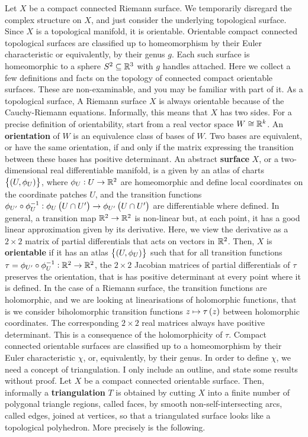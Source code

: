 Let $ X $ be a compact connected Riemann surface. We temporarily disregard the complex structure on $ X $, and just consider the underlying topological surface. Since $ X $ is a topological manifold, it is orientable. Orientable compact connected topological surfaces are classified up to homeomorphism by their Euler characteristic or equivalently, by their genus $ g $. Each such surface is homeomorphic to a sphere $ S^2 \subseteq \mathbb{R}^3 $ with $ g $ handles attached. Here we collect a few definitions and facts on the topology of connected compact orientable surfaces. These are non-examinable, and you may be familiar with part of it. As a topological surface, A Riemann surface $ X $ is always orientable because of the Cauchy-Riemann equations. Informally, this means that $ X $ has two sides. For a precise definition of orientability, start from a real vector space $ W \cong \mathbb{R}^k $. An \textbf{orientation} of $ W $ is an equivalence class of bases of $ W $. Two bases are equivalent, or have the same orientation, if and only if the matrix expressing the transition between these bases has positive determinant. An abstract \textbf{surface} $ X $, or a two-dimensional real differentiable manifold, is a given by an atlas of charts $ \cbr{\br{U, \phi_U}} $, where $ \phi_U : U \to \mathbb{R}^2 $ are homeomorphic and define local coordinates on the coordinate patches $ U $, and the transition functions $ \phi_{U'} \circ \phi_U^{-1} : \phi_U\br{U \cap U'} \to \phi_{U'}\br{U \cap U'} $ are differentiable where defined. In general, a transition map $ \mathbb{R}^2 \to \mathbb{R}^2 $ is non-linear but, at each point, it has a good linear approximation given by its derivative. Here, we view the derivative as a $ 2 \times 2 $ matrix of partial differentials that acts on vectors in $ \mathbb{R}^2 $. Then, $ X $ is \textbf{orientable} if it has an atlas $ \cbr{\br{U, \phi_U}} $ such that for all transition functions $ \tau = \phi_{U'} \circ \phi_U^{-1} : \mathbb{R}^2 \to \mathbb{R}^2 $, the $ 2 \times 2 $ Jacobian matrices of partial differentials of $ \tau $ preserves the orientation, that is has positive determinant at every point where it is defined. In the case of a Riemann surface, the transition functions are holomorphic, and we are looking at linearisations of holomorphic functions, that is we consider biholomorphic transition functions $ z \mapsto \tau\br{z} $ between holomorphic coordinates. The corresponding $ 2 \times 2 $ real matrices always have positive determinant. This is a consequence of the holomorphicity of $ \tau $. Compact connected orientable surfaces are classified up to a homeomorphism by their Euler characteristic $ \chi $, or, equivalently, by their genus. In order to define $ \chi $, we need a concept of triangulation. I only include an outline, and state some results without proof. Let $ X $ be a compact connected orientable surface. Then, informally a \textbf{triangulation} $ T $ is obtained by cutting $ X $ into a finite number of polygonal triangle regions, called faces, by smooth non-self-intersecting arcs, called edges, joined at vertices, so that a triangulated surface looks like a topological polyhedron. More precisely is the following.
